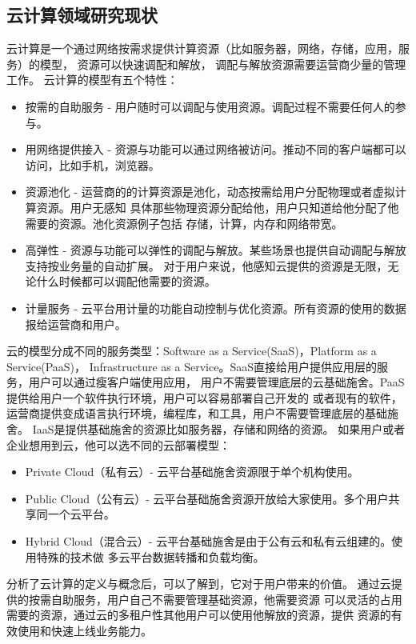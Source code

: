 \subsection{云计算领域研究现状}
\label{subsec:cloud_background}
云计算是一个通过网络按需求提供计算资源（比如服务器，网络，存储，应用，服务）的模型，
资源可以快速调配和解放，
调配与解放资源需要运营商少量的管理工作。\cite{mell2011nist}
云计算的模型有五个特性：
\begin{itemize}
  \item 按需的自助服务 - 
        用户随时可以调配与使用资源。调配过程不需要任何人的参与。
  \item 用网络提供接入 - 
        资源与功能可以通过网络被访问。推动不同的客户端都可以访问，比如手机，浏览器。
  \item 资源池化 - 
        运营商的的计算资源是池化，动态按需给用户分配物理或者虚拟计算资源。用户无感知
        具体那些物理资源分配给他，用户只知道给他分配了他需要的资源。池化资源例子包括
        存储，计算，内存和网络带宽。
  \item 高弹性 - 
        资源与功能可以弹性的调配与解放。某些场景也提供自动调配与解放支持按业务量的自动扩展。
        对于用户来说，他感知云提供的资源是无限，无论什么时候都可以调配他需要的资源。
  \item 计量服务 - 
        云平台用计量的功能自动控制与优化资源。所有资源的使用的数据报给运营商和用户。
\end{itemize}
云的模型分成不同的服务类型：Software as a Service(SaaS)，Platform as a Service(PaaS)，
Infrastructure as a Service。SaaS直接给用户提供应用层的服务，用户可以通过瘦客户端使用应用，
用户不需要管理底层的云基础施舍。PaaS提供给用户一个软件执行环境，用户可以容易部署自己开发的
或者现有的软件，运营商提供变成语言执行环境，编程库，和工具，用户不需要管理底层的基础施舍。
IaaS是提供基础施舍的资源比如服务器，存储和网络的资源。
如果用户或者企业想用到云，他可以选不同的云部署模型：
\begin{itemize}
  \item Private Cloud（私有云）- 
        云平台基础施舍资源限于单个机构使用。
  \item Public Cloud（公有云）- 
        云平台基础施舍资源开放给大家使用。多个用户共享同一个云平台。
  \item Hybrid Cloud（混合云）-
        云平台基础施舍是由于公有云和私有云组建的。使用特殊的技术做
        多云平台数据转播和负载均衡。
\end{itemize}

分析了云计算的定义与概念后，可以了解到，它对于用户带来的价值。
通过云提供的按需自助服务，用户自己不需要管理基础资源，他需要资源
可以灵活的占用需要的资源，通过云的多租户性其他用户可以使用他解放的资源，提供
资源的有效使用和快速上线业务能力。

